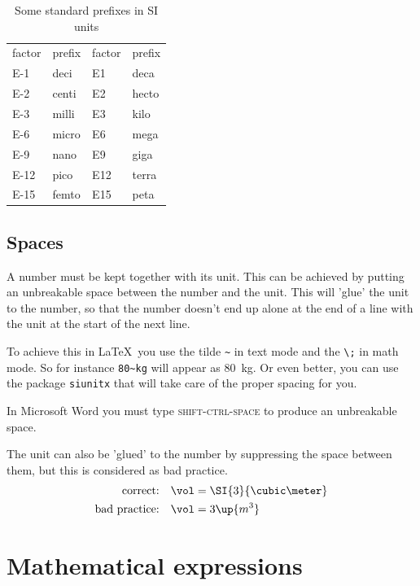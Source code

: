 \begin{table}\centering
\caption{Some standard prefixes in SI units}\label{t:factors}
    \begin{tabular}{llll}
        \toprule
        factor & prefix & factor & prefix \\[+1.5ex]
        \num{E-1}  & deci  &  \num{E1}  & deca \\
        \num{E-2}  & centi &  \num{E2}  & hecto \\
        \num{E-3}  & milli &  \num{E3}  & kilo \\
        \num{E-6}  & micro &  \num{E6}  & mega \\
        \num{E-9}  & nano  &  \num{E9}  & giga \\
        \num{E-12} & pico  &  \num{E12} & terra \\
        \num{E-15} & femto &  \num{E15} & peta \\
        \bottomrule
    \end{tabular}
\end{table}

\subsection{Spaces}
A number must be kept together with its unit. This can be achieved by putting an unbreakable space between the number and the unit. This will 'glue' the unit to the number, so that the number doesn't end up alone at the end of a line with the unit at the start of the next line.

To achieve this in \LaTeX\ you use the tilde \verb|~| in text mode and the \verb|\;| in math mode. So for instance \verb|80~kg| will appear as 80~kg. Or even better, you can use the package \verb|siunitx| that will take care of the proper spacing for you.

In Microsoft Word you must type \textsc{shift-ctrl-space} to produce an unbreakable space.

The unit can also be 'glued' to the number by suppressing the space between them, but this is considered as bad practice.
\begin{align*}
    \text{correct:} \quad & \vol =\SI{3}{\cubic\meter} \\
    \text{bad practice:} \quad & \vol = 3 \up{m ^ 3}
\end{align*}

\section{Mathematical expressions}\label{sec:formatmath}
